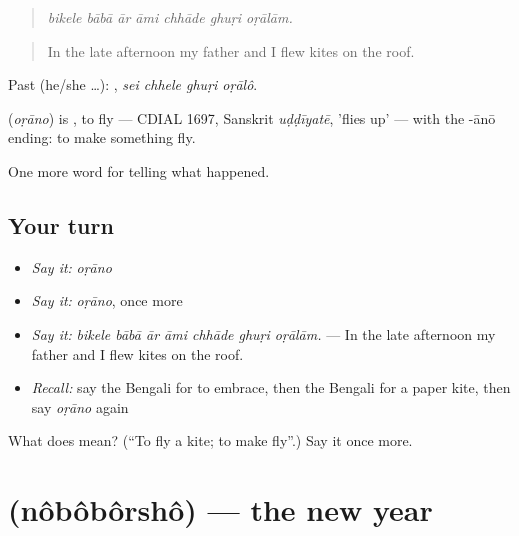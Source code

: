 \begin{quote}
      
\end{quote}

\begin{quote}
\emph{bikele bābā ār āmi chhāde ghuṛi oṛālām.}
\end{quote}

\begin{quote}
In the late afternoon my father and I flew kites on the roof.
\end{quote}

Past (he/she …):    , \emph{sei chhele ghuṛi oṛālô}.

\begin{cousinweb}
\textbf{} (\emph{oṛāno}) is \textbf{}, to fly — CDIAL 1697, Sanskrit \emph{uḍḍīyatē}, 'flies up' — with the -ānō ending: to make something fly.
\end{cousinweb}

\begin{grammarlens}[title={What you've built}]
One more word for telling what happened.
\end{grammarlens}

\subsection*{Your turn}
\begin{itemize}
\raggedright
  \item \emph{Say it:} \emph{oṛāno}
  \item \emph{Say it:} \emph{oṛāno}, once more
  \item \emph{Say it:} \emph{bikele bābā ār āmi chhāde ghuṛi oṛālām.} — In the late afternoon my father and I flew kites on the roof.
  \item \emph{Recall:} say the Bengali for to embrace, then the Bengali for a paper kite, then say \emph{oṛāno} again
\end{itemize}

\begin{tcolorbox}[breakable,colback=teal!4,colframe=teal!35!black,title={Before you move on}]
What does  mean? (\textquotedblleft{}To fly a kite; to make fly\textquotedblright{}.) Say it once more.
\end{tcolorbox}
\section[\texorpdfstring{\bn{নববর্ষ} (nôbôbôrshô)}{নববর্ষ (nôbôbôrshô)}]{ (nôbôbôrshô) — the new year}

